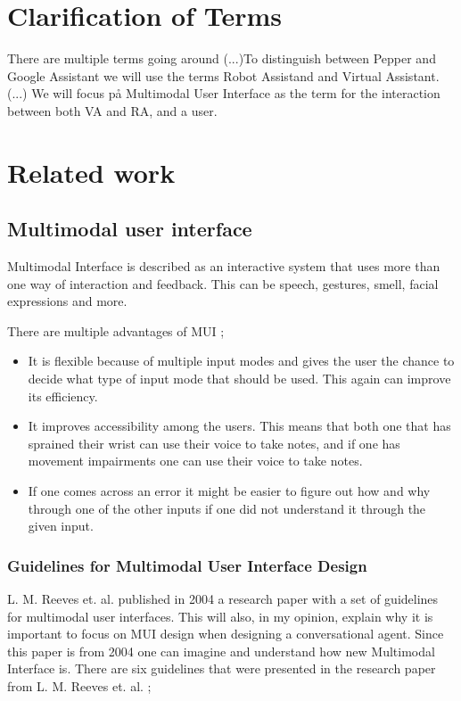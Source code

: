 \documentclass[fleqn,10pt]{wlscirep}
\begin{document}
\section{Clarification of Terms}
There are multiple terms going around (...)To distinguish between Pepper and Google Assistant we will use the terms Robot Assistand and Virtual Assistant. (...) We will focus på Multimodal User Interface as the term for the interaction between both VA and RA, and a user.

\section{Related work}

\subsection{Multimodal user interface}
Multimodal Interface is described as an interactive system that uses more than one way of interaction and feedback. This can be speech, gestures, smell, facial expressions and more. \cite{turk.m}

There are multiple advantages of MUI \cite{turk.m}; 
\begin{itemize}
    \item It is flexible because of multiple input modes and gives the user the chance to decide what type of input mode that should be used. This again can improve its efficiency.  
    \item It improves accessibility among the users. This means that both one that has sprained their wrist can use their voice to take notes, and if one has movement impairments one can use their voice to take notes. 
    \item If one comes across an error it might be easier to figure out how and why through one of the other inputs if one did not understand it through the given input. 
\end{itemize}

\subsubsection{Guidelines for Multimodal User Interface Design} 
L. M. Reeves et. al. \cite{reeves.lm} published in 2004 a research paper with a set of guidelines for multimodal user interfaces. This will also, in my opinion, explain why it is important to focus on MUI design when designing a conversational agent. Since this paper is from 2004 one can imagine and understand how new Multimodal Interface is.  There are six guidelines that were presented in the research paper from L. M. Reeves et. al. \cite{reeves.lm}; 
\end{document}
